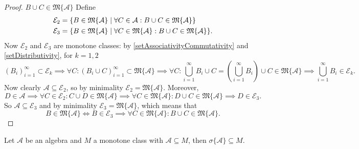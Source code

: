 \begin{proof}
$\boxed{B\cup C \in \mathfrak{M}\{\mathcal{A}\}}$ Define
\begin{align*}
\mathcal{E}_2 &= \setbuilder{B\in\mathfrak{M}\{\mathcal{A}\}}{\forall C\in\mathcal{A}: B\cup C \in\mathfrak{M}\{\mathcal{A}\}} \\
\mathcal{E}_3 &= \setbuilder{B\in\mathfrak{M}\{\mathcal{A}\}}{\forall C\in\mathfrak{M}\{\mathcal{A}\}: B\cup C \in\mathfrak{M}\{\mathcal{A}\}}.
\end{align*}
Now $\mathcal{E}_2$ and $\mathcal{E}_3$ are monotone classes: by \ref{setAssociativityCommutativity} and \ref{setDistributivity}, for $k=1,2$
\[ (B_i)_{i=1}^\infty\subset \mathcal{E}_k \implies \forall C: (B_i\cup C)_{i=1}^\infty\subset \mathfrak{M}\{\mathcal{A}\} \implies \forall C: \bigcup_{i=1}^\infty B_i\cup C = \left(\bigcup_{i=1}^\infty B_i\right)\cup C \in\mathfrak{M}\{\mathcal{A}\} \implies \bigcup_{i=1}^\infty B_i \in \mathcal{E}_k. \]
Now clearly $\mathcal{A}\subseteq\mathcal{E}_2$, so by minimality $\mathcal{E}_2 = \mathfrak{M}\{\mathcal{A}\}$. Moreover,
\[ D\in\mathcal{A}\implies \forall C\in \mathcal{E}_2: C\cup D\in \mathfrak{M}\{\mathcal{A}\} \implies \forall C\in \mathfrak{M}\{\mathcal{A}\}: D\cup C\in \mathfrak{M}\{\mathcal{A}\} \implies D\in \mathcal{E}_3. \]
So $\mathcal{A}\subseteq\mathcal{E}_3$ and by minimality $\mathcal{E}_3 = \mathfrak{M}\{\mathcal{A}\}$, which means that
\[ B\in\mathfrak{M}\{\mathcal{A}\} \iff B\in\mathcal{E}_3 \implies \forall C\in\mathfrak{M}\{\mathcal{A}\}: B\cup C\in\mathfrak{M}\{\mathcal{A}\}. \]
\end{proof}
\begin{corollary}
Let $\mathcal{A}$ be an algebra and $M$ a monotone class with $\mathcal{A}\subseteq M$, then $\sigma\{\mathcal{A}\}\subseteq M$.
\end{corollary}

